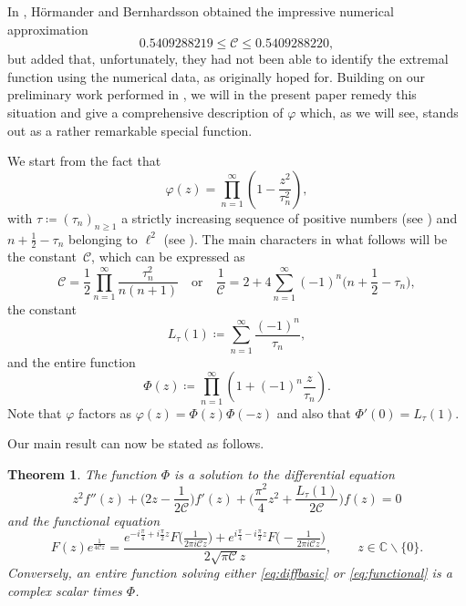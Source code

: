 \documentclass[12pt]{amsart}
\theoremstyle{plain}
\newtheorem{theorem}{Theorem}[section]
\numberwithin{equation}{section}
\theoremstyle{definition}
\newcommand{\C}{\mathbb{C}}
\newcommand{\Cone}{\mathscr{C}}
\begin{document}
In  \cite{HB93}, H\"{o}rmander and Bernhardsson obtained the impressive numerical approximation
\begin{equation}\label{eq:hb}
	0.5409288219 \leq \Cone \leq 0.5409288220,
\end{equation}
but added that, unfortunately, they had not been able to identify the extremal function using
the numerical data, as originally hoped for. Building on our preliminary work performed in \cite{BORS}, we will in the present paper remedy this situation and give a comprehensive description of $\varphi$ which, as we will see,  stands out as a rather remarkable special function.

We start from the fact that
\[ \varphi(z) = \prod_{n=1}^\infty \left(1-\frac{z^2}{\tau_n^2}\right),\]
with $\tau\coloneqq (\tau_n)_{n\geq1}$ a strictly increasing sequence of positive numbers
(see \cite{HB93, LL15, BCOS}) and $n+\frac12-\tau_n$ belonging to $\ell^2$ (see
\cite{BORS}). The main characters in what follows will be the constant~$\Cone$, which can
be expressed as
\begin{equation} \label{eq:expressC}  \Cone = \frac{1}{2}\prod_{n=1}^\infty \frac{\tau_n^2}{n(n+1)} \quad \text{or} \quad \frac{1}{\Cone}=2+4\sum_{n=1}^\infty (-1)^n \Big(n+\frac12-\tau_n\Big), \end{equation}
the constant
\[ L_{\tau}(1)\coloneqq \sum_{n=1}^\infty \frac{(-1)^n}{\tau_n} , \]
and the entire function
\[  \Phi(z)\coloneqq \prod_{n=1}^\infty\left(1+(-1)^n\frac{z}{\tau_n}\right). \]
Note that $\varphi$ factors as $\varphi(z)=\Phi(z)\Phi(-z)$ and also that $\Phi'(0)=L_\tau(1)$.

Our main result can now be stated as follows.

\begin{theorem}\label{thm:main}
The function $\Phi$ is a solution to the differential equation
\begin{equation} \label{eq:diffbasic} z^2f''(z) + \Big(2z-\frac{1}{2\Cone}\Big)f'(z) + \Big(\frac{\pi^2}{4}z^2+\frac{L_{\tau}(1)}{2\Cone}\Big)f(z) = 0 \end{equation}
and the functional equation
\begin{equation} \label{eq:functional} F(z) e^{\frac{1}{4\Cone z}}=
\frac{e^{-i\frac{\pi}{4}+i\frac{\pi}{2}z} F\big(\frac{1}{2\pi i \Cone
z}\big)+e^{i\frac{\pi}{4}-i\frac{\pi}{2}z} F\big(-\frac{1}{2\pi i \Cone
z}\big)}{2\sqrt{\pi \Cone}z} ,\qquad z\in \C\smallsetminus \{0\} . \end{equation}
Conversely, an entire function solving either \eqref{eq:diffbasic} or \eqref{eq:functional} is a complex scalar times $\Phi$.
\end{theorem}
\end{document}
